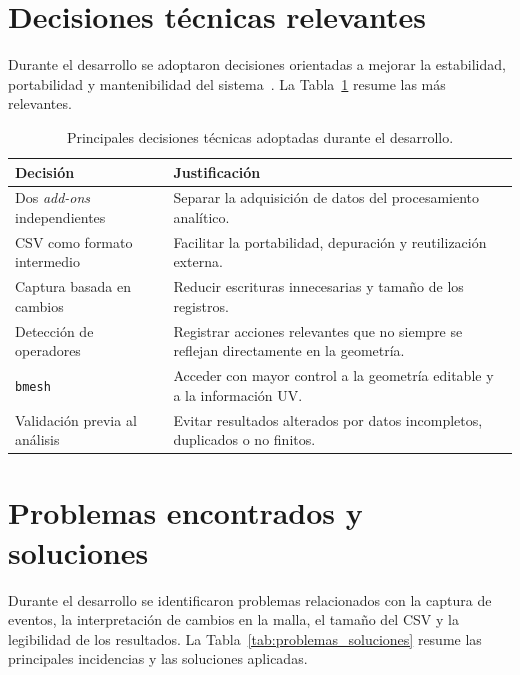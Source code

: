 \section{Decisiones técnicas relevantes}

Durante el desarrollo se adoptaron decisiones orientadas a mejorar la estabilidad, portabilidad y mantenibilidad del sistema~\cite{pressman2005}. La Tabla~\ref{tab:decisiones_tecnicas} resume las más relevantes.

\begin{table}[H]
\centering
\small
\begin{tabularx}{\textwidth}{p{}X}
\toprule
\textbf{Decisión} & \textbf{Justificación} \\
\midrule
Dos \textit{add-ons} independientes & Separar la adquisición de datos del procesamiento analítico. \\
CSV como formato intermedio & Facilitar la portabilidad, depuración y reutilización externa. \\
Captura basada en cambios & Reducir escrituras innecesarias y tamaño de los registros. \\
Detección de operadores & Registrar acciones relevantes que no siempre se reflejan directamente en la geometría. \\
\texttt{bmesh} & Acceder con mayor control a la geometría editable y a la información UV. \\
Validación previa al análisis & Evitar resultados alterados por datos incompletos, duplicados o no finitos. \\
\bottomrule
\end{tabularx}
\caption{Principales decisiones técnicas adoptadas durante el desarrollo.}
\label{tab:decisiones_tecnicas}
\end{table}

\section{Problemas encontrados y soluciones}

Durante el desarrollo se identificaron problemas relacionados con la captura de eventos, la interpretación de cambios en la malla, el tamaño del CSV y la legibilidad de los resultados. La Tabla~\ref{tab:problemas_soluciones} resume las principales incidencias y las soluciones aplicadas.

